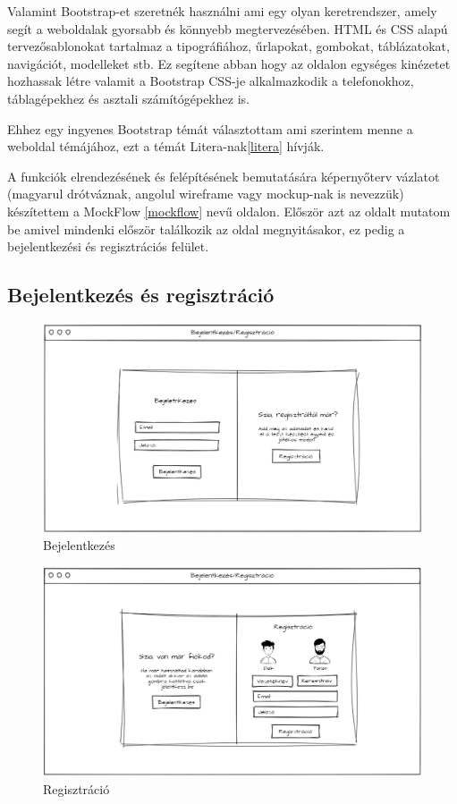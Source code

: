 Valamint Bootstrap-et szeretnék használni ami egy olyan keretrendszer, amely segít a weboldalak gyorsabb és könnyebb megtervezésében. HTML és CSS alapú tervezősablonokat tartalmaz a tipográfiához, űrlapokat, gombokat, táblázatokat, navigációt, modelleket stb. Ez segítene abban hogy az oldalon egységes kinézetet hozhassak létre valamit a Bootstrap CSS-je alkalmazkodik a telefonokhoz, táblagépekhez és asztali számítógépekhez is.

Ehhez egy ingyenes Bootstrap témát választottam ami szerintem menne a weboldal témájához, ezt a témát Litera-nak\ref{litera} hívják.


A funkciók elrendezésének és felépítésének bemutatására képernyőterv vázlatot (magyarul drótváznak, angolul wireframe vagy mockup-nak is nevezzük) készítettem a MockFlow \ref{mockflow} nevű oldalon.
Először azt az oldalt mutatom be amivel mindenki először találkozik az oldal megnyitásakor, ez pedig a bejelentkezési és regisztrációs felület.

\subsection{Bejelentkezés és regisztráció}

\begin{figure}[H]
    \centering
    \includegraphics[width=\linewidth]{images/login_wireframe.png}
    \caption{Bejelentkezés}
    \label{fig:login_wireframe}
\end{figure}

\begin{figure}[H]
    \centering
    \includegraphics[width=\linewidth]{images/signin_wireframe.png}
    \caption{Regisztráció}
    \label{fig:signin_wireframe}
\end{figure}

